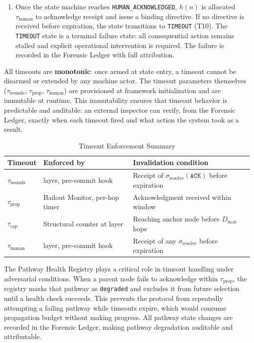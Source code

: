 \begin{enumerate}
\item[$\textbf{\tau_{\text{human}} ---\ Human acknowledgment timeout.}$] Once the state machine reaches \texttt{HUMAN\_ACKNOWLEDGED}, $h(n)$ is allocated $\tau_{\text{human}}$ to acknowledge receipt and issue a binding directive. If no directive is received before expiration, the state transitions to \texttt{TIMEOUT} (T10). The \texttt{TIMEOUT} state is a terminal failure state: all consequential action remains stalled and explicit operational intervention is required. The failure is recorded in the Forensic Ledger with full attribution.
\end{enumerate}

All timeouts are \textbf{monotonic}: once armed at state entry, a timeout cannot be disarmed or extended by any machine actor. The timeout parameters themselves ($\tau_{\text{bounds}}$, $\tau_{\text{prop}}$, $\tau_{\text{human}}$) are provisioned at framework initialization and are immutable at runtime. This immutability ensures that timeout behavior is predictable and auditable: an external inspector can verify, from the Forensic Ledger, exactly when each timeout fired and what action the system took as a result.

\begin{table}[t]
\caption{Timeout Enforcement Summary}
\label{tab:bp-timeout-enforcement}
\medskip
\noindent\begin{tabular}{lp{3cm}p{5cm}}
\toprule
\textbf{Timeout} & \textbf{Enforced by} & \textbf{Invalidation condition} \\
\midrule
$\tau_{\text{bounds}}$  & \fact{} layer, pre-commit hook & Receipt of $\sigma_{\text{resolve}}(\texttt{ACK})$ before expiration \\
$\tau_{\text{prop}}$   & Bailout Monitor, per-hop timer & Acknowledgment received within window \\
$\tau_{\text{cap}}$    & Structural counter at \fact{} layer & Reaching anchor node before $D_{\max}$ hops \\
$\tau_{\text{human}}$  & \fact{} layer, pre-commit hook & Receipt of any $\sigma_{\text{resolve}}$ before expiration \\
\bottomrule
\end{tabular}
\end{table}

The Pathway Health Registry plays a critical role in timeout handling under adversarial conditions. When a parent node fails to acknowledge within $\tau_{\text{prop}}$, the registry marks that pathway as \texttt{degraded} and excludes it from future selection until a health check succeeds. This prevents the protocol from repeatedly attempting a failing pathway while timeouts expire, which would consume propagation budget without making progress. All pathway state changes are recorded in the Forensic Ledger, making pathway degradation auditable and attributable.
